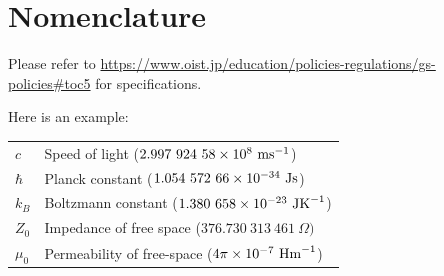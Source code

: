 \chapter*{Nomenclature}

Please refer to \url{https://www.oist.jp/education/policies-regulations/gs-policies#toc5} for specifications.

Here is an example:

\setlength\LTleft{-5pt} %

\begin{longtable}{l p{}}
    $c$     & Speed of light ($2.997\ 924\ 58 \times 10^{8}\ \mbox{ms}^{-1}$)    \\
    $\hbar$ & Planck constant ($1.054\ 572\ 66\times 10^{-34}\ \mbox{Js}$)       \\
    $k_B$   & Boltzmann constant  ($1.380\ 658\times 10^{-23}\ \mbox{JK}^{-1} $) \\
    $Z_0$   & Impedance of free space  ($376.730\ 313\ 461\ \Omega) $    \\
    $\mu_0$ & Permeability of free-space ($4\pi\times 10^{-7}\ \mbox{Hm}^{-1}$)  \\
\end{longtable}
